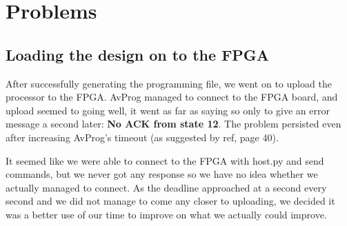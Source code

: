 \section{Problems}

\subsection{Loading the design on to the FPGA}
\label{subsec:uploadproblems}

After successfully generating the programming file, we went on to upload the processor to the FPGA.
AvProg managed to connect to the FPGA board, and upload seemed to going well, it went as far as saying so only to give an error message a second later: \textbf{No ACK from state 12}.
The problem persisted even after increasing AvProg's timeout (as suggested by ref, page 40). %

It seemed like we were able to connect to the FPGA with host.py and send commands, but we never got any response so we have no idea whether we actually managed to connect.
As the deadline approached at a second every second and we did not manage to come any closer to uploading, we decided it was a better use of our time to improve on what we actually could improve.
